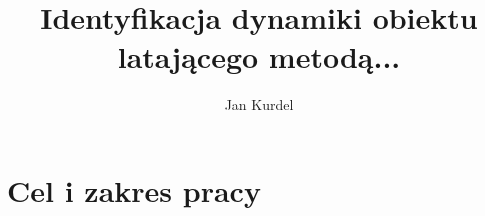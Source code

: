 \documentclass{article}
\begin{document}
\title{Identyfikacja dynamiki obiektu latającego metodą...}
\author{Jan Kurdel}
\maketitle

\newpage

\section{Cel i zakres pracy}
\end{document}
